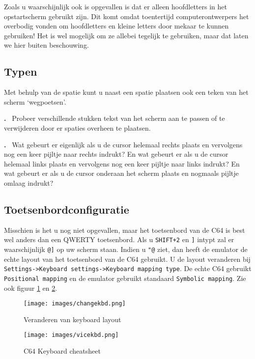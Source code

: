 \documentclass{article}
\newcounter{problem}
\newcounter{solution}
\newcommand\problem{%
  \stepcounter{problem}%
  \textbf{\theproblem.}~%
  \setcounter{solution}{0}%
}
\begin{document}
Zoals u waarschijnlijk ook is opgevallen is dat er alleen hoofdletters in het opstartscherm gebruikt zijn.
Dit komt omdat toentertijd computerontwerpers het overbodig vonden om hoofdletters en kleine letters door mekaar te kunnen gebruiken!
Het is wel mogelijk om ze allebei tegelijk te gebruiken, maar dat laten we hier buiten beschouwing.

\subsection{Typen}

Met behulp van de spatie kunt u naast een spatie plaatsen ook een teken van het scherm `wegpoetsen'.

\problem Probeer verschillende stukken tekst van het scherm aan te passen of te verwijderen door er spaties overheen te plaatsen.

\problem Wat gebeurt er eigenlijk als u de cursor helemaal rechts plaats en vervolgens nog een keer pijltje naar rechts indrukt?
En wat gebeurt er als u de cursor helemaal links plaats en vervolgens nog een keer pijltje naar links indrukt?
En wat gebeurt er als u de cursor onderaan het scherm plaats en nogmaals pijltje omlaag indrukt?

\subsection{Toetsenbordconfiguratie}

Misschien is het u nog niet opgevallen, maar het toetsenbord van de C64 is best wel anders dan een QWERTY toetsenbord.
Als u \verb:SHIFT+2: en \verb:]: intypt zal er waarschijnlijk \verb:@]: op uw scherm staan.
Indien u \verb:"@: ziet, dan heeft de emulator de echte layout van het toetsenbord van de C64 gebruikt.
U de layout veranderen bij \verb:Settings->Keyboard settings->Keyboard mapping type:.
De echte C64 gebruikt \verb:Positional mapping: en de emulator gebruikt standaard \verb:Symbolic mapping:.
Zie ook figuur \ref{fig:changekbd} en \ref{fig:vicekbd}.

\begin{figure}
\centering
\texttt{[image: images/changekbd.png]}
\caption{Veranderen van keyboard layout}
\label{fig:changekbd}
\end{figure}

\begin{figure}
\centering
\texttt{[image: images/vicekbd.png]}
\caption{C64 Keyboard cheatsheet}
\label{fig:vicekbd}
\end{figure}
\end{document}
